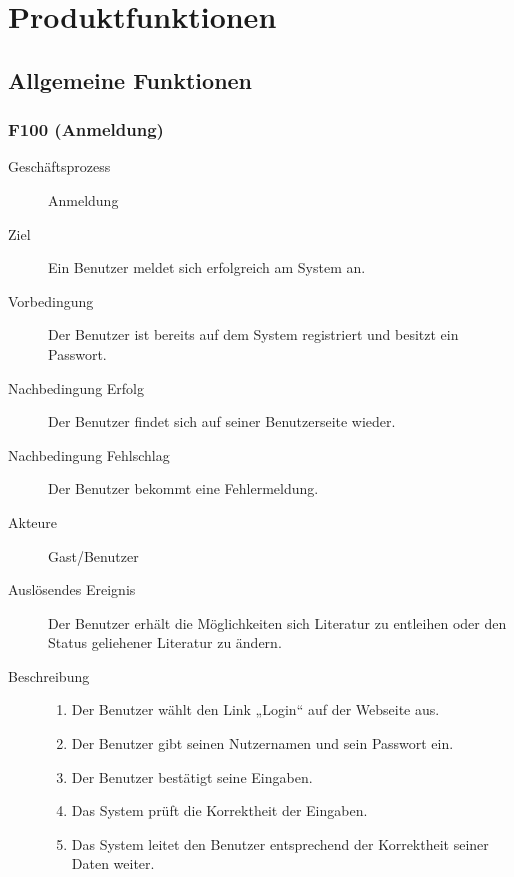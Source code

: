 
\chapter{Produktfunktionen}

\section{Allgemeine Funktionen}
\subsection{F100 (Anmeldung)}
\begin{description}
  \item[Geschäftsprozess]Anmeldung
  \item[Ziel]Ein Benutzer meldet sich erfolgreich am System an.
  \item[Vorbedingung]Der Benutzer ist bereits auf dem System registriert und besitzt ein Passwort.
  \item[Nachbedingung Erfolg]Der Benutzer findet sich auf seiner Benutzerseite wieder.
  \item[Nachbedingung Fehlschlag]Der Benutzer bekommt eine Fehlermeldung.
  \item[Akteure]Gast/Benutzer
  \item[Auslösendes Ereignis]Der Benutzer erhält die Möglichkeiten sich Literatur zu entleihen oder den Status geliehener Literatur zu ändern.
  \item[Beschreibung]
    \begin{enumerate}
      \item Der Benutzer wählt den Link „Login“ auf der Webseite aus.
      \item Der Benutzer gibt seinen Nutzernamen und sein Passwort ein.
      \item Der Benutzer bestätigt seine Eingaben.
      \item Das System prüft die Korrektheit der Eingaben.
      \item Das System leitet den Benutzer entsprechend der Korrektheit seiner Daten weiter.
    \end{enumerate}
\end{description}

